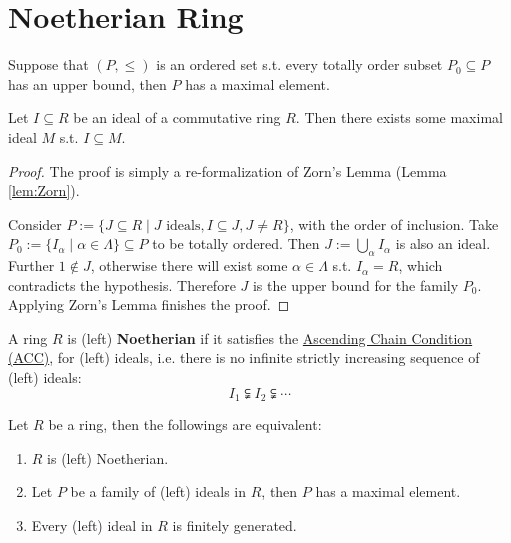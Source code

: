 \section{Noetherian Ring}

\begin{lemma} \label{lem:Zorn}
    Suppose that $(P, \leq)$ is an ordered set s.t. every totally order subset $P_0 \subseteq P$ has an upper bound, then $P$ has a maximal element. 
\end{lemma}

\begin{theorem} \label{thm:maximal ideal inclusion}
    Let $I \subseteq R$ be an ideal of a commutative ring $R$. Then there exists some maximal ideal $M$ s.t. $I \subseteq M$.
\end{theorem}

\begin{proof}
    The proof is simply a re-formalization of Zorn's Lemma (Lemma \ref{lem:Zorn}). 
    
    Consider $P := \{ J \subseteq R \mid J \text{ ideals}, I \subseteq J, J \neq R \}$, with the order of inclusion. Take $P_0 := \{I_{\alpha} \mid \alpha\in \Lambda\} \subseteq P$ to be totally ordered. Then $J := \bigcup_{\alpha} I_{\alpha}$ is also an ideal. Further $1\notin J$, otherwise there will exist some $\alpha\in \Lambda$ s.t. $I_{\alpha} = R$, which contradicts the hypothesis. Therefore $J$ is the upper bound for the family $P_0$. Applying Zorn's Lemma finishes the proof. 
\end{proof}

\begin{definition}
    A ring $R$ is (left) \textbf{Noetherian} if it satisfies the \underline{Ascending Chain Condition (ACC)}, for (left) ideals, i.e. there is no infinite strictly increasing sequence of (left) ideals:
    \[
        I_1 \subsetneqq I_2 \subsetneqq \cdots
    \]
\end{definition}

\begin{proposition}\label{prop:Noeth f.g.}
    Let $R$ be a ring, then the followings are equivalent:
    \begin{enumerate}
        \item $R$ is (left) Noetherian.
        \item Let $P$ be a family of (left) ideals in $R$, then $P$ has a maximal element.
        \item Every (left) ideal in $R$ is finitely generated.  
    \end{enumerate}
\end{proposition}


